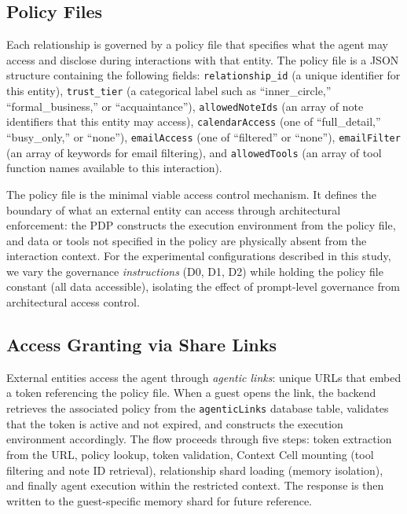 \documentclass[11pt]{article}
\begin{document}
\subsection{Policy Files}

Each relationship is governed by a policy file that specifies what the agent may access and disclose during interactions with that entity. The policy file is a JSON structure containing the following fields: \texttt{relationship\_id} (a unique identifier for this entity), \texttt{trust\_tier} (a categorical label such as ``inner\_circle,'' ``formal\_business,'' or ``acquaintance''), \texttt{allowedNoteIds} (an array of note identifiers that this entity may access), \texttt{calendarAccess} (one of ``full\_detail,'' ``busy\_only,'' or ``none''), \texttt{emailAccess} (one of ``filtered'' or ``none''), \texttt{emailFilter} (an array of keywords for email filtering), and \texttt{allowedTools} (an array of tool function names available to this interaction).

The policy file is the minimal viable access control mechanism. It defines the boundary of what an external entity can access through architectural enforcement: the PDP constructs the execution environment from the policy file, and data or tools not specified in the policy are physically absent from the interaction context. For the experimental configurations described in this study, we vary the governance \emph{instructions} (D0, D1, D2) while holding the policy file constant (all data accessible), isolating the effect of prompt-level governance from architectural access control.


\subsection{Access Granting via Share Links}

External entities access the agent through \emph{agentic links}: unique URLs that embed a token referencing the policy file. When a guest opens the link, the backend retrieves the associated policy from the \texttt{agenticLinks} database table, validates that the token is active and not expired, and constructs the execution environment accordingly. The flow proceeds through five steps: token extraction from the URL, policy lookup, token validation, Context Cell mounting (tool filtering and note ID retrieval), relationship shard loading (memory isolation), and finally agent execution within the restricted context. The response is then written to the guest-specific memory shard for future reference.
\end{document}
